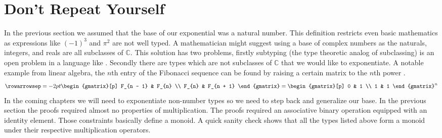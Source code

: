 \documentclass[./Thesis.tex]{subfiles}
\begin{document}
\section{Don't Repeat Yourself}
\label{sec:dont-repeat-yourself}
In the previous section we assumed that the base of our exponential was a
natural number. This definition restricts even basic mathematics as expressions
like $(-1)^3$ and $\pi^2$ are not well typed. A mathematician might suggest
using a base of complex numbers as the naturals, integers, and reals are all
subclasses of $\mathbb{C}$. This solution has two problems, firstly subtyping
(the type theoretic analog of subclassing) is an open problem in a language like
\Agda{} \cite{algebraic-subtyping}. Secondly there are types which are not
subclasses of $\mathbb{C}$ that we would like to exponentiate. A notable example
from linear algebra, the $n$th entry of the Fibonacci sequence can be found by
raising a certain matrix to the $n$th power \cite{linear-algebra}.
\begin{align}
  \label{eqn:fib-example}
  \rowarrowsep=-2pt
  \begin{gmatrix}[p]
    F_{n - 1} & F_{n} \\
    F_{n} & F_{n + 1}
  \end{gmatrix}
  =
  {
  \begin{gmatrix}[p]
    0 & 1 \\
    1 & 1
  \end{gmatrix}
  }^n
\end{align}
In the coming chapters we will need to exponentiate non-number types so we need
to step back and generalize our base. In the previous section the proofs
required almost no properties of multiplication. The proofs required an
associative binary operation equipped with an identity element. Those
constraints basically define a monoid. A quick sanity check shows that all the
types listed above form a monoid under their respective multiplication
operators. \\
\end{document}
